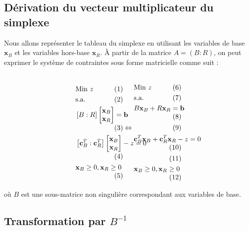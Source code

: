\documentclass{report}
\begin{document}
\begin{multicols*}{2}

\section{Dérivation du vecteur multiplicateur du simplexe}

Nous allons représenter le tableau du simplexe en utilisant les variables de base \( \mathbf{x}_B \) et les variables hors-base \( \mathbf{x}_R \). À partir de la matrice \( A = (B : R) \), on peut exprimer le système de contraintes sous forme matricielle comme suit :

\[
\begin{minipage}{0.20\textwidth}
\begin{align*}
& \text{Min } z \notag \\
& \text{s.a.} \notag \\
& \left[B : R\right]
\begin{bmatrix}
\mathbf{x}_B \\
\mathbf{x}_R
\end{bmatrix} = \mathbf{b} \notag \\
& \left[ \mathbf{c}_B^T : \mathbf{c}_R^T \right] 
\begin{bmatrix}
\mathbf{x}_B \\
\mathbf{x}_R
\end{bmatrix} - z = 0 \notag \\
& \mathbf{x}_B \geq 0, \mathbf{x}_R \geq 0 \notag
\end{align*}
\end{minipage}
\Leftrightarrow
\begin{minipage}{0.20\textwidth}
\begin{align*}
& \text{Min } z \notag \\
& \text{s.a.} \notag \\
& B \mathbf{x}_B + R \mathbf{x}_R = \mathbf{b} \notag \\\\
& \mathbf{c}_B^T \mathbf{x}_B + \mathbf{c}_R^T \mathbf{x}_R - z = 0 \notag \\\\
& \mathbf{x}_B \geq 0, \mathbf{x}_R \geq 0 \notag
\end{align*}
\end{minipage}
\]

où \( B \) est une sous-matrice non singulière correspondant aux variables de base.

\subsection{Transformation par \( B^{-1} \)}


\end{multicols*}
\end{document}
